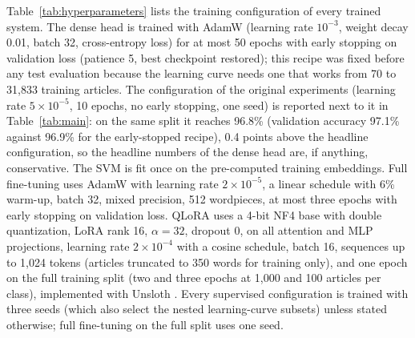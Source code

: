 \documentclass[preprint,12pt,authoryear]{elsarticle}
\newif\ifrevmarkup
\DeclareRobustCommand{\rev}[1]{\ifrevmarkup{\color{blue}#1}\else#1\fi}
\begin{document}
\rev{Table~\ref{tab:hyperparameters} lists the training configuration of every trained system. The dense head is trained with AdamW (learning rate $10^{-3}$, weight decay 0.01, batch 32, cross-entropy loss) for at most 50 epochs with early stopping on validation loss (patience 5, best checkpoint restored); this recipe was fixed before any test evaluation because the learning curve needs one that works from 70 to 31,833 training articles. The configuration of the original experiments (learning rate $5\times10^{-5}$, 10 epochs, no early stopping, one seed) is reported next to it in Table~\ref{tab:main}: on the same split it reaches 96.8\% (validation accuracy 97.1\% against 96.9\% for the early-stopped recipe), 0.4 points above the headline configuration, so the headline numbers of the dense head are, if anything, conservative. The SVM is fit once on the pre-computed training embeddings. Full fine-tuning uses AdamW with learning rate $2\times10^{-5}$, a linear schedule with 6\% warm-up, batch 32, mixed precision, 512 wordpieces, at most three epochs with early stopping on validation loss. QLoRA uses a 4-bit NF4 base with double quantization, LoRA rank 16, $\alpha=32$, dropout 0, on all attention and MLP projections, learning rate $2\times10^{-4}$ with a cosine schedule, batch 16, sequences up to 1,024 tokens (articles truncated to 350 words for training only), and one epoch on the full training split (two and three epochs at 1,000 and 100 articles per class), implemented with Unsloth \cite{unsloth2024}. Every supervised configuration is trained with three seeds (which also select the nested learning-curve subsets) unless stated otherwise; full fine-tuning on the full split uses one seed.}
\end{document}
